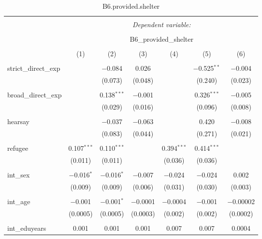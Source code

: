 
\begin{table}[H] \centering 
  \caption{B6.provided.shelter} 
  \label{} 
\tiny 
\begin{tabular}{@{\extracolsep{4pt}}lcccccc} 
\\[-1.8ex]\hline 
\hline \\[-1.8ex] 
 & \multicolumn{6}{c}{\textit{Dependent variable:}} \\ 
\cline{2-7} 
\\[-1.8ex] & \multicolumn{6}{c}{B6\_provided\_shelter} \\ 
\\[-1.8ex] & (1) & (2) & (3) & (4) & (5) & (6)\\ 
\hline \\[-1.8ex] 
 strict\_direct\_exp &  & $-$0.084 & 0.026 &  & $-$0.525$^{**}$ & $-$0.004 \\ 
  &  & (0.073) & (0.048) &  & (0.240) & (0.023) \\ 
  & & & & & & \\ 
 broad\_direct\_exp &  & 0.138$^{***}$ & $-$0.001 &  & 0.326$^{***}$ & $-$0.005 \\ 
  &  & (0.029) & (0.016) &  & (0.096) & (0.008) \\ 
  & & & & & & \\ 
 hearsay &  & $-$0.037 & $-$0.063 &  & 0.420 & $-$0.008 \\ 
  &  & (0.083) & (0.044) &  & (0.271) & (0.021) \\ 
  & & & & & & \\ 
 refugee & 0.107$^{***}$ & 0.110$^{***}$ &  & 0.394$^{***}$ & 0.414$^{***}$ &  \\ 
  & (0.011) & (0.011) &  & (0.036) & (0.036) &  \\ 
  & & & & & & \\ 
 int\_sex & $-$0.016$^{*}$ & $-$0.016$^{*}$ & $-$0.007 & $-$0.024 & $-$0.024 & 0.002 \\ 
  & (0.009) & (0.009) & (0.006) & (0.031) & (0.030) & (0.003) \\ 
  & & & & & & \\ 
 int\_age & $-$0.001 & $-$0.001$^{*}$ & $-$0.0001 & $-$0.0004 & $-$0.001 & $-$0.00002 \\ 
  & (0.0005) & (0.0005) & (0.0003) & (0.002) & (0.002) & (0.0002) \\ 
  & & & & & & \\ 
 int\_eduyears & 0.001 & 0.001 & 0.001 & 0.007 & 0.007 & 0.0004 \\ 

\end{tabular}
\end{table}
